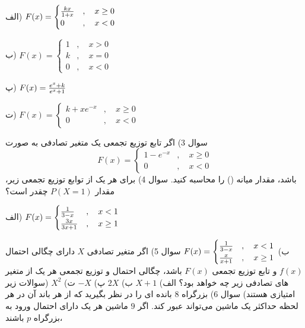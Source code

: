 \documentclass[10pt,letterpaper]{article}
\begin{document}
الف) 
$
F(x)=\begin{cases}
{kx\over 1+x}&,\quad x\ge0
\\
0&,\quad x<0
\end{cases}
$

ب) 
$
F(x)=\begin{cases}
1&,\quad x>0
\\k&,\quad x=0
\\0&,\quad x<0
\end{cases}
$

پ) 
$
F(x)={e^x+k\over e^x+1}
$

ت)
$
F(x)=\begin{cases}
k+xe^{-x}&,\quad x\ge0
\\
0&,\quad x<0
\end{cases}
$

سوال 3) اگر تابع توزیع تجمعی یک متغیر تصادفی به صورت 
$$
F(x)=\begin{cases}
1-e^{-x}&,\quad x\ge0
\\
0&,\quad x<0
\end{cases}
$$
باشد، مقدار میانه () را محاسبه کنید.
\newline
\newline
سوال 4) برای هر یک از توابع توزیع تجمعی زیر، مقدار 
$
P(X=1)
$
 چقدر است؟

الف)
$
F(x)=\begin{cases}
{1\over 3-x}&,\quad x<1
\\{3x\over 3x+1}&,\quad x\ge1
\end{cases}
$

ب)
$
F(x)=\begin{cases}
{1\over 3-x}&,\quad x<1
\\{x\over x+1}&,\quad x\ge1
\end{cases}
$
\newline
\newline
سوال 5) اگر متغیر تصادفی $X$ دارای چگالی احتمال $f(x)$ و تابع توزیع تجمعی $F(x)$ باشد، چگالی احتمال و توزیع تجمعی هر یک از متغیر های تصادفی زیر چه خواهد بود؟
\newline
\newline
الف) $X+1$
\newline
\newline
ب) $2X$
\newline
\newline
پ) $-X$
\newline
\newline
ت) $X^2$
\newline
\newline
(سوالات زیر امتیازی هستند)
\newline
\newline
سوال 6) بزرگراه $8$ بانده ای را در نظر بگیرید که از هر باند آن در هر لحظه حداکثر یک ماشین می‌تواند عبور کند. اگر $9$ ماشین هر یک دارای احتمال ورود به بزرگراه $p$ باشند،
\end{document}

